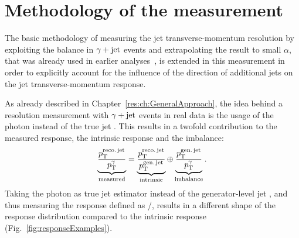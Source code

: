 \chapter{Methodology of the measurement}
\label{res:ch:methodology}

The basic methodology of measuring the jet transverse-momentum resolution by exploiting the \pt balance in $\gamma + \text{jet}$ events and extrapolating the result to small $\alpha$, that was already used in earlier analyses~\cite{bib:CMS:JERCPaper_2011,CMS:PAS:JETResolution_7TeV}, is extended in this measurement in order to explicitly account for the influence of the direction of additional jets on the jet transverse-momentum response.

As already described in Chapter~\ref{res:ch:GeneralApproach}, the idea behind a resolution measurement with $\gamma + \text{jet}$ events in real data is the usage of the photon \pt instead of the true jet \pt.
This results in a twofold contribution to the measured response, the intrinsic response and the imbalance:
\begin{equation}\label{eq:splittedResolution}
\underbrace{\frac{{p}_\mathrm{T}^{\text{reco.\,jet}}}{{p}_\mathrm{T}^{\gamma}}}_{\text{measured}} = \underbrace{\frac{{p}_\mathrm{T}^{\text{reco.\,jet}}}{{p}_\mathrm{T}^{\text{gen.\,jet}}}}_{\text{intrinsic}} \oplus \underbrace{\frac{{p}_\mathrm{T}^{\text{gen.\,jet}}}{{p}_\mathrm{T}^{\gamma}}}_{\text{imbalance}}.
\end{equation}
Taking the photon \pt as true jet \pt estimator instead of the generator-level jet \pt, and thus measuring the response defined as \ptrecojet/\ptgamma, results in a different shape of the response distribution compared to the intrinsic response (Fig.~\ref{fig:responseExamples}). 
